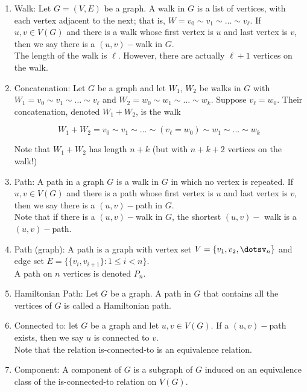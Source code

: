 \documentclass{article}
\begin{document}
\begin{enumerate}
    \item Walk: Let $G=(V,E)$ be a graph. A walk in $G$ is a list of vertices, with each vertex adjacent to the next; that is, $W=v_0\sim v_1\sim\dots\sim v_\ell$. If $u,v\in V(G)$ and there is a walk whose first vertex is $u$ and last vertex is $v$, then we say there is a $(u,v)-$walk in $G$.\\
    
    The length of the walk is $\ell$. However, there are actually $\ell +1$ vertices on the walk.
    
    \item Concatenation: Let $G$ be a graph and let $W_1$, $W_2$ be walks in $G$ with $W_1=v_0\sim v_1\sim \dots\sim v_\ell$ and $W_2=w_0\sim w_1\sim \dots\sim w_k$. Suppose $v_\ell=w_0$. Their concatenation, denoted $W_1+W_2$, is the walk
    
    \[W_1+W_2=v_0\sim v_1\sim...\sim(v_\ell=w_0)\sim w_1\sim...\sim w_k\]
    
    Note that $W_1+W_2$ has length $n+k$ (but with $n+k+2$ vertices on the walk!)
    
    \item Path: A path in a graph $G$ is a walk in $G$ in which no vertex is repeated. If $u,v\in V(G)$ and there is a path whose first vertex is $u$ and last vertex is $v$, then we say there is a $(u,v)-$path in $G$. \\
    
    Note that if there is a $(u,v)-$walk in $G$, the shortest $(u,v)-$ walk is a $(u,v)-$path.
    
    \item Path (graph): A path is a graph with vertex set $V=\{v_1,v_2,\dotsv_n\}$ and edge set $E=\{\{v_i,v_{i+1}\}:1\leq i<n\}$.\\
    
    A path on $n$ vertices is denoted $P_n$.
    
    \item Hamiltonian Path: Let $G$ be a graph. A path in $G$ that contains all the vertices of $G$ is called a Hamiltonian path.
    
    \item Connected to: let $G$ be a graph and let $u,v\in V(G)$. If a $(u,v)-$path exists, then we say $u$ is connected to $v$.\\
    
    Note that the relation is-connected-to is an equivalence relation.
    
    \item Component: A component of $G$ is a subgraph of $G$ induced on an equivalence class of the is-connected-to relation on $V(G)$.
    

\end{enumerate}
\end{document}

